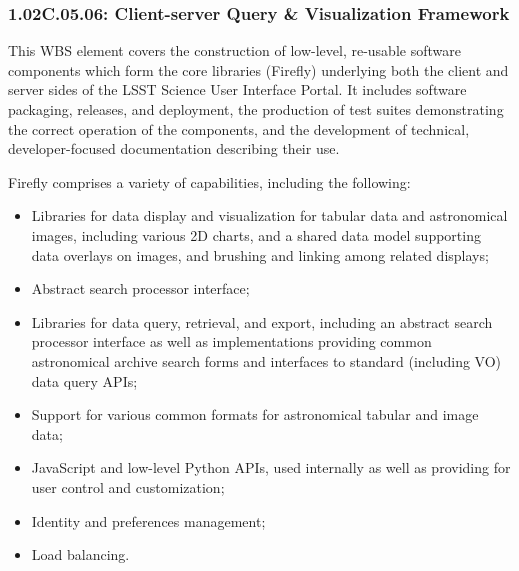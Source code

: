 \subsubsection{1.02C.05.06: Client-server Query \& Visualization Framework}
This WBS element covers the construction of low-level, re-usable software components which form the core libraries (Firefly) underlying both the client and server sides of the LSST Science User Interface Portal. It includes software packaging, releases, and deployment, the production of test suites demonstrating the correct operation of the components, and the development of technical, developer-focused documentation describing their use.

Firefly comprises a variety of capabilities, including the following:
\begin{itemize}

\item{Libraries for data display and visualization for tabular data and astronomical images, including various 2D charts, and a shared data model supporting data overlays on images, and brushing and linking among related displays;}
\item{Abstract search processor interface;}
\item{Libraries for data query, retrieval, and export, including an abstract search processor interface as well as implementations providing common astronomical archive search forms and interfaces to standard (including VO) data query APIs;}

\item{Support for various common formats for astronomical tabular and image data;}
\item{JavaScript and low-level Python APIs, used internally as well as providing for user control and customization;}
\item{Identity and preferences management;}
\item{Load balancing.}

\end{itemize}

